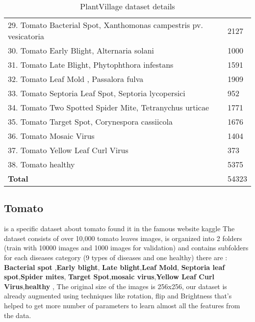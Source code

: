 \begin{table}[]
\begin{tabular}{@{}|p{10cm}|p{3cm}|@{}}
29. Tomato Bacterial Spot, Xanthomonas campestris pv. vesicatoria & 2127 \\
30. Tomato Early Blight, Alternaria solani & 1000 \\
31. Tomato Late Blight, Phytophthora infestans & 1591 \\
32. Tomato Leaf Mold , Passalora fulva & 1909 \\
33. Tomato Septoria Leaf Spot, Septoria lycopersici & 952 \\
34. Tomato Two Spotted Spider Mite, Tetranychus urticae & 1771 \\
35. Tomato Target Spot, Corynespora cassiicola & 1676 \\
36. Tomato Mosaic Virus & 1404 \\
37. Tomato Yellow Leaf Curl Virus & 373 \\
38. Tomato healthy & 5375 \\
 \hline
 \centering \textbf{Total} & 54323 \\ \hline
\end{tabular}
\caption{PlantVillage dataset details}
\end{table}
\subsection{Tomato} is a specific dataset about tomato found it in the famous website kaggle \cite{w1} 
The dataset consists of over 10,000 tomato leaves images, is organized into
2 folders (train with 10000 images and 1000 images for validation) and contains subfolders for each diseases category (9 types of diseases and one healthy) there are : \textbf{Bacterial spot} ,\textbf{Early blight},
\textbf{Late blight},\textbf{Leaf Mold},
\textbf{Septoria leaf spot},\textbf{Spider mites},
\textbf{Target Spot},\textbf{mosaic virus},\textbf{Yellow Leaf Curl Virus},\textbf{healthy} , The original size of the images is 256x256, our dataset is already augmented using techniques like rotation, flip and Brightness that's helped to get more number of parameters to learn almost all the features from the data.

